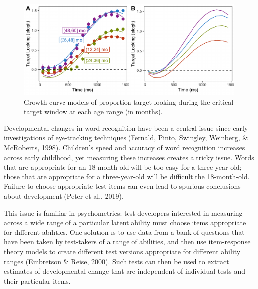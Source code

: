 \documentclass[10pt, letterpaper]{article}
\newenvironment{CodeChunk}{}{}
\begin{document}
\begin{CodeChunk}
\begin{figure}[h]

{\centering \includegraphics{figs/age_gca-1} 

}

\caption[Growth curve models of proportion target looking during the critical target window at each age range (in months)]{Growth curve models of proportion target looking during the critical target window at each age range (in months).}\label{fig:age_gca}
\end{figure}
\end{CodeChunk}

Developmental changes in word recognition have been a central issue
since early investigations of eye-tracking techniques (Fernald, Pinto,
Swingley, Weinberg, \& McRoberts, 1998). Children's speed and accuracy
of word recognition increases across early childhood, yet measuring
these increases creates a tricky issue. Words that are appropriate for
an 18-month-old will be too easy for a three-year-old; those that are
appropriate for a three-year-old will be difficult the 18-month-old.
Failure to choose appropriate test items can even lead to spurious
conclusions about development (Peter et al., 2019).

This issue is familiar in psychometrics: test developers interested in
measuring across a wide range of a particular latent ability must choose
items appropriate for different abilities. One solution is to use data
from a bank of questions that have been taken by test-takers of a range
of abilities, and then use item-response theory models to create
different test versions appropriate for different ability ranges
(Embretson \& Reise, 2000). Such tests can then be used to extract
estimates of developmental change that are independent of individual
tests and their particular items.
\end{document}
